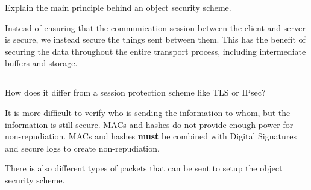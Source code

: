 \begin{questions}
\question{} Explain the main principle behind an object security scheme.
  \begin{solution}
    Instead of ensuring that the communication session between the client and server is secure, we instead secure the things sent between them.
    This has the benefit of securing the data throughout the entire transport process, including intermediate buffers and storage.
  \end{solution}

  \begin{parts}
  \part{} How does it differ from a session protection scheme like TLS or IPsec?
    \begin{solution}
      It is more difficult to verify who is sending the information to whom, but the information is still secure.
      MACs and hashes do not provide enough power for non-repudiation.
      MACs and hashes \textbf{must} be combined with Digital Signatures and secure logs to create non-repudiation.

      There is also different types of packets that can be sent to setup the object security scheme.
    \end{solution}
  \end{parts}


\end{questions}
